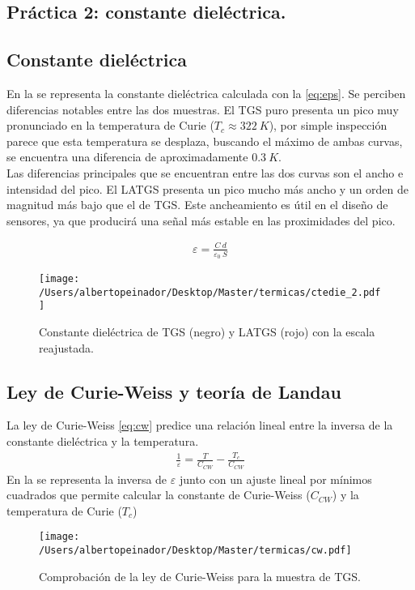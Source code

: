\documentclass[a4paper, 12pt, spanish]{article}
\begin{document}
\begin{multicols}{2}
\section{Práctica 2: constante dieléctrica.}
\subsection*{Constante dieléctrica}
En la  se representa la constante dieléctrica calculada con la \cref{eq:eps}. Se perciben diferencias notables entre las dos muestras. El TGS puro presenta un pico muy pronunciado en la temperatura de Curie ($T_c\approx 322\ K$), por simple inspección parece que esta temperatura se desplaza, buscando el máximo de ambas curvas, se encuentra una diferencia de aproximadamente $0.3\ K$.\\
Las diferencias principales que se encuentran entre las dos curvas son el ancho e intensidad del pico. El LATGS presenta un pico mucho más ancho y un orden de magnitud más bajo que el de TGS. Este ancheamiento es útil en el diseño de sensores, ya que producirá una señal más estable en las proximidades del pico.

\begin{eqnarray}
    \varepsilon = \frac{C\ d}{\varepsilon_0\ S} \label{eq:eps}
\end{eqnarray}
\begin{figure}[H]
    \centering
    \texttt{[image: /Users/albertopeinador/Desktop/Master/termicas/ctedie\_2.pdf]}
    \caption{Constante dieléctrica de TGS (negro) y LATGS (rojo) con la escala reajustada.}\label{fig:eps}
\end{figure}
\subsection*{Ley de Curie-Weiss y teoría de Landau}
La ley de Curie-Weiss \cref{eq:cw} predice una relación lineal entre la inversa de la constante dieléctrica y la temperatura.
\begin{eqnarray}
    \frac{1}{\varepsilon} = \frac{T}{C_{CW}}-\frac{T_c}{C_{CW}}\label{eq:cw}
\end{eqnarray}
En la  se representa la inversa de $\varepsilon$ junto con un ajuste lineal por mínimos cuadrados que permite calcular la constante de Curie-Weiss ($C_{CW}$) y la temperatura de Curie ($T_c$)
\begin{figure}[H]
    \centering
    \texttt{[image: /Users/albertopeinador/Desktop/Master/termicas/cw.pdf]}
    \caption{Comprobación de la ley de Curie-Weiss para la muestra de TGS.}\label{fig:cw}
\end{figure}


\end{multicols}
\end{document}
